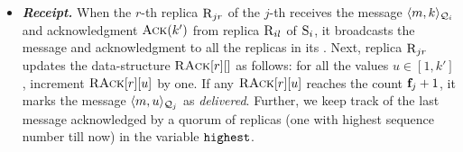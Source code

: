 \begin{itemize}[wide]
\item {\bf \em Receipt.}
When the $r$-th replica $\textsc{R}_{{j}{r}}$ of the $j$-th \RSM{} receives the 
message $\langle m, k\rangle_{\mathcal{Q}_{i}}$ and acknowledgment $\textsc{Ack}(k')$ from replica $\textsc{R}_{{i}{l}}$ of \RSM{} $\textsc{S}_{i}$,
it broadcasts the message and acknowledgment to all the replicas in its \RSM{}.
Next, replica $\textsc{R}_{{j}{r}}$ updates the data-structure $\textsc{RAck}[{r}][{}]$ as follows:
for all the values $u \in [1,k']$, increment $\textsc{RAck}[{r}][{u}]$ by one.
If any $\textsc{RAck}[{r}][{u}]$ reaches the count $\textbf{f}_{j}+1$, it marks the message $\langle m, u\rangle_{\mathcal{Q}_{j}}$ 
as {\em delivered}.
Further, we keep track of the last message acknowledged by a quorum of replicas (one with highest sequence number till now) in the variable $\texttt{highest}{}$.

%


\end{itemize}


%
%



